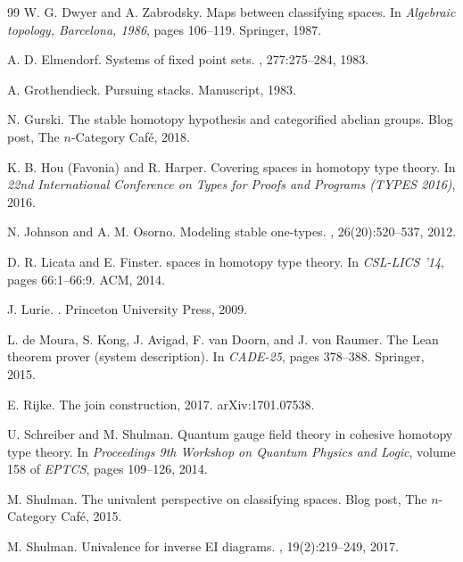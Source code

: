 \documentclass[12pt]{article}
\begin{document}
\begin{thebibliography}{99}
W. G. Dwyer and A. Zabrodsky.
\newblock Maps between classifying spaces.
\newblock In {\em Algebraic topology, Barcelona, 1986}, pages 106--119. Springer, 1987.

A. D. Elmendorf.
\newblock Systems of fixed point sets.
, 277:275--284, 1983.

A. Grothendieck.
\newblock Pursuing stacks.
\newblock Manuscript, 1983.

N. Gurski.
\newblock The stable homotopy hypothesis and categorified abelian groups.
\newblock Blog post, The $n$-Category Café, 2018.

K. B. Hou (Favonia) and R. Harper.
\newblock Covering spaces in homotopy type theory.
\newblock In {\em 22nd International Conference on Types for Proofs and Programs (TYPES 2016)}, 2016.

N. Johnson and A. M. Osorno.
\newblock Modeling stable one-types.
, 26(20):520--537, 2012.

D. R. Licata and E. Finster.
 spaces in homotopy type theory.
\newblock In {\em CSL-LICS '14}, pages 66:1--66:9. ACM, 2014.

J. Lurie.
.
\newblock Princeton University Press, 2009.

L. de Moura, S. Kong, J. Avigad, F. van Doorn, and J. von Raumer.
\newblock The {Lean} theorem prover (system description).
\newblock In {\em CADE-25}, pages 378--388. Springer, 2015.

E. Rijke.
\newblock The join construction, 2017.
\newblock arXiv:1701.07538.

U. Schreiber and M. Shulman.
\newblock Quantum gauge field theory in cohesive homotopy type theory.
\newblock In {\em Proceedings 9th Workshop on Quantum Physics and Logic}, volume 158 of {\em EPTCS}, pages 109--126, 2014.

M. Shulman.
\newblock The univalent perspective on classifying spaces.
\newblock Blog post, The $n$-Category Café, 2015.

M. Shulman.
\newblock Univalence for inverse {EI} diagrams.
, 19(2):219--249, 2017.


\end{thebibliography}
\end{document}
